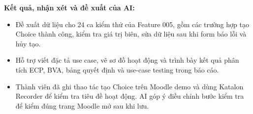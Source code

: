 \documentclass[12pt,a4paper]{article}
\begin{document}
\noindent\textbf{Kết quả, nhận xét và đề xuất của AI:}
\begin{itemize}[noitemsep]
  \item Đề xuất dữ liệu cho 24 ca kiểm thử của Feature 005, gồm các trường hợp tạo Choice thành công, kiểm tra giá trị biên, sửa dữ liệu sau khi form báo lỗi và hủy tạo.
  \item Hỗ trợ viết đặc tả use case, vẽ sơ đồ hoạt động và trình bày kết quả phân tích ECP, BVA, bảng quyết định và use-case testing trong báo cáo.
  \item Thành viên đã ghi thao tác tạo Choice trên Moodle demo và dùng Katalon Recorder để kiểm tra tiêu đề hoạt động. AI góp ý điều chỉnh bước kiểm tra để kiểm đúng trang Moodle mở sau khi lưu.
\end{itemize}
\end{document}
